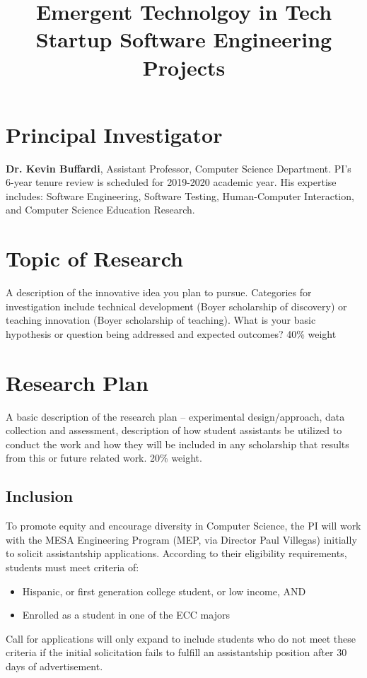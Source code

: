 \documentclass[letterpaper]{article}
\title{Emergent Technolgoy in Tech Startup Software Engineering Projects}
\author{}
\date{}
\begin{document}
\maketitle
\section{Principal Investigator}

\textbf{Dr. Kevin Buffardi}, Assistant Professor, Computer Science Department.
PI's 6-year tenure review is scheduled for 2019-2020 academic year. His expertise includes: Software Engineering, Software Testing, Human-Computer Interaction, and Computer Science Education Research.

\section{Topic of Research}
A description of the innovative idea you plan to pursue. Categories for
investigation include technical development (Boyer scholarship of discovery) or teaching innovation (Boyer scholarship of teaching). What is your basic hypothesis or question being addressed and expected outcomes? 40\% weight

\section{Research Plan}
A basic description of the research plan – experimental design/approach, data
collection and assessment, description of how student assistants be utilized to conduct the work and how they will be included in any scholarship that results from this or future related work. 20\% weight.

\subsection{Inclusion}
To promote equity and encourage diversity in Computer Science, the PI will work with the MESA Engineering Program (MEP, via Director Paul Villegas) initially to solicit assistantship applications. According to their eligibility requirements, students must meet criteria of:
\begin{itemize}
  \item Hispanic, or first generation college student, or low income, AND
  \item Enrolled as a student in one of the ECC majors
\end{itemize}
Call for applications will only expand to include students who do not meet these criteria if the initial solicitation fails to fulfill an assistantship position after 30 days of advertisement.
\end{document}
